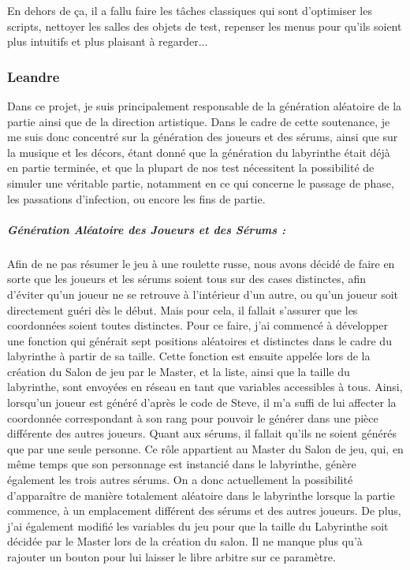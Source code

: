 \documentclass{article}
\begin{document}
En dehors de ça, il a fallu faire les tâches classiques qui sont d'optimiser les scripts, nettoyer les salles des objets de test, repenser les menus pour qu'ils soient plus intuitifs et plus plaisant à regarder...

\newpage
\subsubsection{Leandre}

Dans ce projet, je suis principalement responsable de la génération aléatoire de la partie ainsi que de la direction artistique. Dans le cadre de cette soutenance, je me suis donc concentré sur la génération des joueurs et des sérums, ainsi que sur la musique et les décors, étant donné que la génération du labyrinthe était déjà en partie terminée, et que la plupart de nos test nécessitent la possibilité de simuler une véritable partie, notamment en ce qui concerne le passage de phase, les passations d'infection, ou encore les fins de partie.

\subparagraph{Génération Aléatoire des Joueurs et des Sérums :}


Afin de ne pas résumer le jeu à une roulette russe, nous avons décidé de faire en sorte que les joueurs et les sérums soient tous sur des cases distinctes, afin d'éviter qu'un joueur ne se retrouve à l'intérieur d'un autre, ou qu'un joueur soit directement guéri dès le début. Mais pour cela, il fallait s'assurer que les coordonnées soient toutes distinctes. Pour ce faire, j'ai commencé à développer une fonction qui générait sept positions aléatoires et distinctes dans le cadre du labyrinthe à partir de sa taille. Cette fonction est ensuite appelée lors de la création du Salon de jeu par le Master, et la liste, ainsi que la taille du labyrinthe, sont envoyées en réseau en tant que variables accessibles à tous. Ainsi, lorsqu'un joueur est généré d'après le code de Steve, il m'a suffi de lui affecter la coordonnée correspondant à son rang pour pouvoir le générer dans une pièce différente des autres joueurs. Quant aux sérums, il fallait qu'ils ne soient générés que par une seule personne. Ce rôle appartient au Master du Salon de jeu, qui, en même temps que son personnage est instancié dans le labyrinthe, génère également les trois autres sérums. On a donc actuellement la possibilité d'apparaître de manière totalement aléatoire dans le labyrinthe lorsque la partie commence, à un emplacement différent des sérums et des autres joueurs. De plus, j'ai également modifié les variables du jeu pour que la taille du Labyrinthe soit décidée par le Master lors de la création du salon. Il ne manque plus qu'à rajouter un bouton pour lui laisser le libre arbitre sur ce paramètre.
\end{document}

